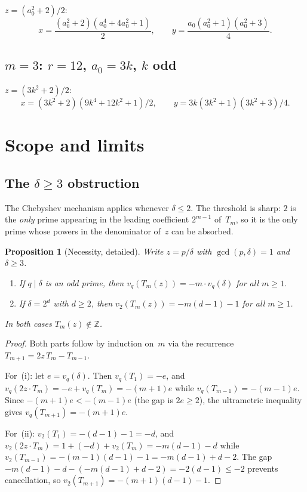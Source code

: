 \documentclass[11pt]{article}
\newtheorem{proposition}[theorem]{Proposition}
\theoremstyle{definition}
\theoremstyle{remark}
\begin{document}
$z = (a_0^2+2)/2$:
\[
x = \frac{(a_0^2+2)(a_0^4+4a_0^2+1)}{2}, \qquad
y = \frac{a_0(a_0^2+1)(a_0^2+3)}{4}.
\]

\subsection*{$m = 3$: $r = 12$, $a_0 = 3k$, $k$ odd}

$z = (3k^2+2)/2$:
\[
x = (3k^2+2)(9k^4+12k^2+1)/2, \qquad
y = 3k(3k^2+1)(3k^2+3)/4.
\]

\section{Scope and limits}

\subsection{The $\delta \ge 3$ obstruction}

The Chebyshev mechanism applies whenever $\delta \le 2$.
The threshold is sharp: $2$ is the \emph{only} prime appearing
in the leading coefficient $2^{m-1}$ of~$T_m$, so it is the only
prime whose powers in the denominator of~$z$ can be absorbed.

\begin{proposition}[Necessity, detailed]\label{prop:necessity}
Write $z = p/\delta$ with $\gcd(p, \delta) = 1$ and $\delta \ge 3$.
\begin{enumerate}
\item[(i)] If $q \mid \delta$ is an odd prime, then
  $v_q(T_m(z)) = -m \cdot v_q(\delta)$ for all $m \ge 1$.
\item[(ii)] If $\delta = 2^d$ with $d \ge 2$, then
  $v_2(T_m(z)) = -m(d{-}1) - 1$ for all $m \ge 1$.
\end{enumerate}
In both cases $T_m(z) \notin \mathbb{Z}$.
\end{proposition}

\begin{proof}
Both parts follow by induction on~$m$ via the recurrence
$T_{m+1} = 2z\,T_m - T_{m-1}$.

For~(i): let $e = v_q(\delta)$.  Then $v_q(T_1) = -e$, and
$v_q(2z \cdot T_m) = -e + v_q(T_m) = -(m{+}1)e$ while
$v_q(T_{m-1}) = -(m{-}1)e$.  Since $-(m{+}1)e < -(m{-}1)e$
(the gap is $2e \ge 2$), the ultrametric inequality gives
$v_q(T_{m+1}) = -(m{+}1)e$.

For~(ii): $v_2(T_1) = -(d{-}1) - 1 = -d$, and
$v_2(2z \cdot T_m) = 1 + (-d) + v_2(T_m) = -m(d{-}1) - d$ while
$v_2(T_{m-1}) = -(m{-}1)(d{-}1) - 1 = -m(d{-}1) + d - 2$.
The gap $-m(d{-}1) - d - (-m(d{-}1) + d - 2) = -2(d{-}1) \le -2$
prevents cancellation, so $v_2(T_{m+1}) = -(m{+}1)(d{-}1) - 1$.
\end{proof}
\end{document}
